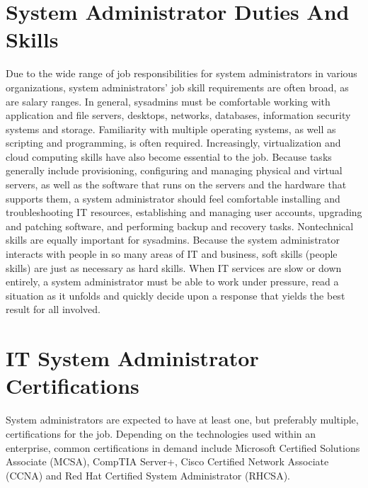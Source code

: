 \section{System Administrator Duties And Skills}
Due to the wide range of job responsibilities for system administrators in various organizations, system administrators' job skill requirements are often broad, as are salary ranges. In general, sysadmins must be comfortable working with application and file servers, desktops, networks, databases, information security systems and storage. Familiarity with multiple operating systems, as well as scripting and programming, is often required. Increasingly, virtualization and cloud computing skills have also become essential to the job.
Because tasks generally include provisioning, configuring and managing physical and virtual servers, as well as the software that runs on the servers and the hardware that supports them, a system administrator should feel comfortable installing and troubleshooting IT resources, establishing and managing user accounts, upgrading and patching software, and performing backup and recovery tasks.
Nontechnical skills are equally important for sysadmins. Because the system administrator interacts with people in so many areas of IT and business, soft skills (people skills) are just as necessary as hard skills. When IT services are slow or down entirely, a system administrator must be able to work under pressure, read a situation as it unfolds and quickly decide upon a response that yields the best result for all involved. 
\section{IT System Administrator Certifications}
System administrators are expected to have at least one, but preferably multiple, certifications for the job. Depending on the technologies used within an enterprise, common certifications in demand include Microsoft Certified Solutions Associate (MCSA), CompTIA Server+, Cisco Certified Network Associate (CCNA) and Red Hat Certified System Administrator (RHCSA).
